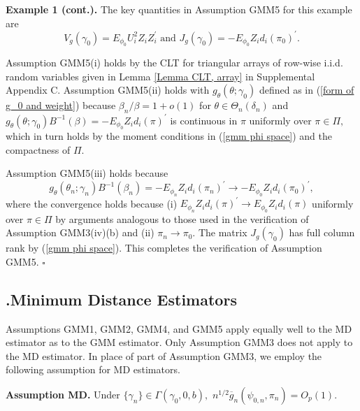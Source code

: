 \documentclass[12pt,titlepage,final,oneside,letterpaper]{article}
\begin{document}
\noindent \textbf{Example 1 (cont.). }The key quantities in Assumption GMM5
for this example are%
\begin{equation}
V_{g}(\gamma _{0})=E_{\phi _{0}}U_{i}^{2}Z_{i}Z_{i}^{\prime }\text{ and }%
J_{g}(\gamma _{0})=-E_{\phi _{0}}Z_{i}d_{i}(\pi _{0})^{\prime }.
\label{GMM C5 -1}
\end{equation}

Assumption GMM5(i) holds by the CLT for triangular arrays of row-wise i.i.d.
random variables given in Lemma \ref{Lemma CLT, array} in Supplemental
Appendix C. Assumption GMM5(ii) holds with $g_{\theta }(\theta ;\gamma _{0})$
defined as in (\ref{form of g_0 and weight}) because $\beta _{n}/\beta
=1+o(1)$ for $\theta \in \Theta _{n}(\delta _{n})$ and $g_{\theta }(\theta
;\gamma _{0})B^{-1}(\beta )=-E_{\phi _{0}}Z_{i}d_{i}(\pi )^{\prime }$ is
continuous in $\pi $ uniformly over $\pi \in \Pi ,$ which in turn holds by
the moment conditions in (\ref{gmm phi space}) and the compactness of $\Pi .$

Assumption GMM5(iii) holds because 
\begin{equation}
g_{\theta }(\theta _{n};\gamma _{n})B^{-1}(\beta _{n})=-E_{\phi
_{n}}Z_{i}d_{i}(\pi _{n})^{\prime }\rightarrow -E_{\phi _{0}}Z_{i}d_{i}(\pi
_{0})^{\prime },
\end{equation}%
where the convergence holds because (i) $E_{\phi _{n}}Z_{i}d_{i}(\pi
)^{\prime }\rightarrow E_{\phi _{0}}Z_{i}d_{i}(\pi )$ uniformly over $\pi
\in \Pi $ by arguments analogous to those used in the verification of
Assumption GMM3(iv)(b) and (ii) $\pi _{n}\rightarrow \pi _{0}.$ The matrix $%
J_{g}(\gamma _{0})$ has full column rank by (\ref{gmm phi space}). This
completes the verification of Assumption GMM5. $\square $

\subsection{\hspace{-0.23in}\textbf{.}\hspace{0.18in}Minimum Distance
Estimators}

\hspace{0.25in}Assumptions GMM1, GMM2, GMM4, and GMM5 apply equally well to
the MD estimator as to the GMM estimator. Only Assumption GMM3 does not
apply to the MD estimator. In place of part of Assumption GMM3, we employ
the following assumption for MD estimators.\medskip

\noindent \textbf{Assumption MD. }Under $\{\gamma _{n}\}\in \Gamma (\gamma
_{0},0,b),$ $n^{1/2}\overline{g}_{n}(\psi _{0,n},\pi _{n})=O_{p}(1).$\medskip
\end{document}
